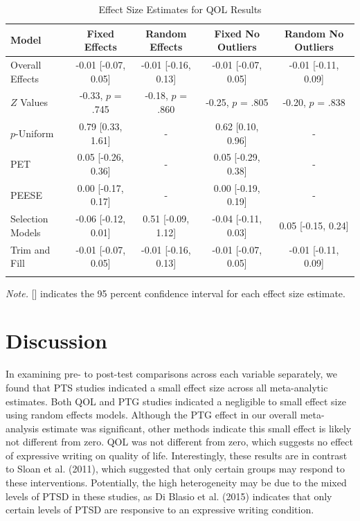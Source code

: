 \documentclass[english,man]{apa6}
\theoremstyle{definition}
\theoremstyle{definition}
\theoremstyle{definition}
\theoremstyle{remark}
\begin{document}
\begin{table}[tbp]
\begin{center}
\begin{threeparttable}
\caption{\label{tab:QOLtable}Effect Size Estimates for QOL Results}
\small{
\begin{tabular}{lcccc}
\toprule
Model & Fixed Effects & Random Effects & Fixed No Outliers & Random No Outliers\\
\midrule
Overall Effects & -0.01 [-0.07, 0.05] & -0.01 [-0.16, 0.13] & -0.01 [-0.07, 0.05] & -0.01 [-0.11, 0.09]\\
$Z$ Values & -0.33, $p$ = .745 & -0.18, $p$ = .860 & -0.25, $p$ = .805 & -0.20, $p$ = .838\\
$p$-Uniform & 0.79 [0.33, 1.61] & - & 0.62 [0.10, 0.96] & -\\
PET & 0.05 [-0.26, 0.36] & - & 0.05 [-0.29, 0.38] & -\\
PEESE & 0.00 [-0.17, 0.17] & - & 0.00 [-0.19, 0.19] & -\\
Selection Models & -0.06 [-0.12, 0.01] & 0.51 [-0.09, 1.12] & -0.04 [-0.11, 0.03] & 0.05 [-0.15, 0.24]\\
Trim and Fill & -0.01 [-0.07, 0.05] & -0.01 [-0.16, 0.13] & -0.01 [-0.07, 0.05] & -0.01 [-0.11, 0.09]\\
\bottomrule
\addlinespace
\end{tabular}
}
\begin{tablenotes}[para]
\textit{Note.} [] indicates the 95 percent confidence interval for each effect size estimate.
\end{tablenotes}
\end{threeparttable}
\end{center}
\end{table}

\section{Discussion}\label{discussion}

In examining pre- to post-test comparisons across each variable
separately, we found that PTS studies indicated a small effect size
across all meta-analytic estimates. Both QOL and PTG studies indicated a
negligible to small effect size using random effects models. Although
the PTG effect in our overall meta-analysis estimate was significant,
other methods indicate this small effect is likely not different from
zero. QOL was not different from zero, which suggests no effect of
expressive writing on quality of life. Interestingly, these results are
in contrast to Sloan et al. (2011), which suggested that only certain
groups may respond to these interventions. Potentially, the high
heterogeneity may be due to the mixed levels of PTSD in these studies,
as Di Blasio et al. (2015) indicates that only certain levels of PTSD
are responsive to an expressive writing condition.
\end{document}
